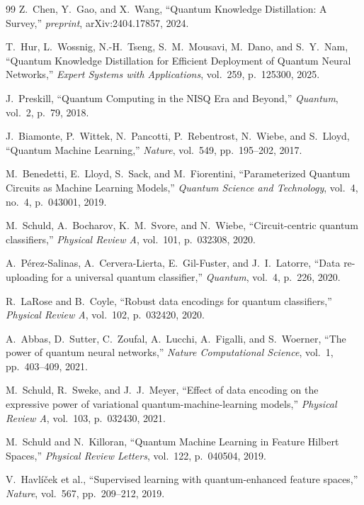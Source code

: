 \documentclass[11pt,a4paper]{article}
\begin{document}
\begin{thebibliography}{99}
Z.~Chen, Y.~Gao, and X.~Wang,
``Quantum Knowledge Distillation: A Survey,''
\textit{preprint}, arXiv:2404.17857, 2024.

T.~Hur, L.~Wossnig, N.-H.~Tseng, S.~M.~Mousavi, M.~Dano, and S.~Y.~Nam,
``Quantum Knowledge Distillation for Efficient Deployment of Quantum Neural Networks,''
\textit{Expert Systems with Applications}, vol.~259, p.~125300, 2025.

J.~Preskill,
``Quantum Computing in the NISQ Era and Beyond,''
\textit{Quantum}, vol.~2, p.~79, 2018.

J.~Biamonte, P.~Wittek, N.~Pancotti, P.~Rebentrost, N.~Wiebe, and S.~Lloyd,
``Quantum Machine Learning,''
\textit{Nature}, vol.~549, pp.~195--202, 2017.

M.~Benedetti, E.~Lloyd, S.~Sack, and M.~Fiorentini,
``Parameterized Quantum Circuits as Machine Learning Models,''
\textit{Quantum Science and Technology}, vol.~4, no.~4, p.~043001, 2019.

M.~Schuld, A.~Bocharov, K.~M.~Svore, and N.~Wiebe,
``Circuit-centric quantum classifiers,''
\textit{Physical Review A}, vol.~101, p.~032308, 2020.

A.~P\'erez-Salinas, A.~Cervera-Lierta, E.~Gil-Fuster, and J.~I.~Latorre,
``Data re-uploading for a universal quantum classifier,''
\textit{Quantum}, vol.~4, p.~226, 2020.

R.~LaRose and B.~Coyle,
``Robust data encodings for quantum classifiers,''
\textit{Physical Review A}, vol.~102, p.~032420, 2020.

A.~Abbas, D.~Sutter, C.~Zoufal, A.~Lucchi, A.~Figalli, and S.~Woerner,
``The power of quantum neural networks,''
\textit{Nature Computational Science}, vol.~1, pp.~403--409, 2021.

M.~Schuld, R.~Sweke, and J.~J.~Meyer,
``Effect of data encoding on the expressive power of variational quantum-machine-learning models,''
\textit{Physical Review A}, vol.~103, p.~032430, 2021.

M.~Schuld and N.~Killoran,
``Quantum Machine Learning in Feature Hilbert Spaces,''
\textit{Physical Review Letters}, vol.~122, p.~040504, 2019.

V.~Havl\'i\v{c}ek et al.,
``Supervised learning with quantum-enhanced feature spaces,''
\textit{Nature}, vol.~567, pp.~209--212, 2019.


\end{thebibliography}
\end{document}
